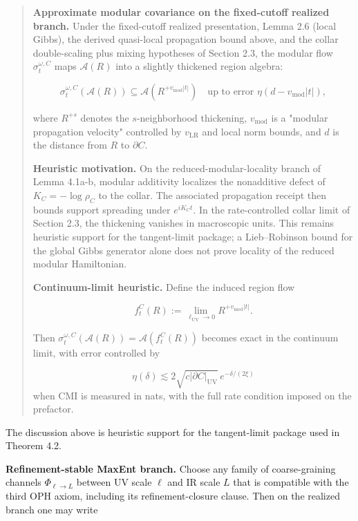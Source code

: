 \begin{quote}
\textbf{Approximate modular covariance on the fixed-cutoff realized branch.} Under the fixed-cutoff realized presentation, Lemma 2.6 (local Gibbs), the derived quasi-local propagation bound above, and the collar double-scaling plus mixing hypotheses of Section 2.3, the modular flow \(\sigma_t^{\omega,C}\) maps \(\mathcal{A}(R)\) into a slightly thickened region algebra:

\[
\sigma_t^{\omega,C}(\mathcal{A}(R)) \subseteq \mathcal{A}(R^{+v_{\mathrm{mod}}|t|})
\quad \text{up to error } \eta(d - v_{\mathrm{mod}}|t|),
\]

where \(R^{+s}\) denotes the \(s\)-neighborhood thickening, \(v_{\mathrm{mod}}\) is a "modular propagation velocity" controlled by \(v_{\mathrm{LR}}\) and local norm bounds, and \(d\) is the distance from \(R\) to \(\partial C\).

\textbf{Heuristic motivation.} On the reduced-modular-locality branch of Lemma 4.1a-b, modular additivity localizes the nonadditive defect of \(K_C = -\log \rho_C\) to the collar. The associated propagation receipt then bounds support spreading under \(e^{iK_C t}\). In the rate-controlled collar limit of Section 2.3, the thickening vanishes in macroscopic units. This remains heuristic support for the tangent-limit package; a Lieb--Robinson bound for the global Gibbs generator alone does not prove locality of the reduced modular Hamiltonian.

\textbf{Continuum-limit heuristic.} Define the induced region flow

\[
f_t^C(R) := \lim_{\ell_{\mathrm{UV}} \to 0} R^{+v_{\mathrm{mod}}|t|}.
\]

Then \(\sigma_t^{\omega,C}(\mathcal{A}(R)) = \mathcal{A}(f_t^C(R))\) becomes exact in the continuum limit, with error controlled by

\[
\eta(\delta) \lesssim 2\sqrt{c|\partial C|_{\mathrm{UV}}}\,e^{-\delta/(2\xi)}
\]
when CMI is measured in nats, with the full rate condition imposed on the prefactor.
\end{quote}

The discussion above is heuristic support for the tangent-limit package used in Theorem 4.2.

\textbf{Refinement-stable MaxEnt branch.} Choose any family of coarse-graining channels \(\Phi_{\ell\to L}\) between UV scale \(\ell\) and IR scale \(L\) that is compatible with the third OPH axiom, including its refinement-closure clause. Then on the realized branch one may write

